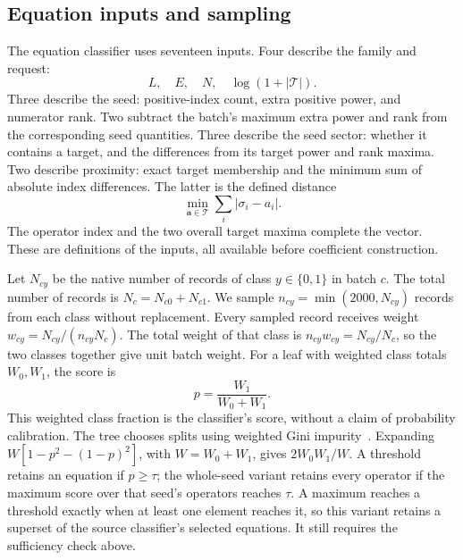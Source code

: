 \subsection{Equation inputs and sampling}
\label{app:equation-model}
The equation classifier uses seventeen inputs. Four describe the family and request:
\[L,\quad E,\quad N,\quad \log(1+|\mathcal T|).\]
 Three describe the seed: positive-index count, extra positive power, and numerator rank. Two subtract the batch's maximum extra power and rank from the corresponding seed quantities. Three describe the seed sector: whether it contains a target, and the differences from its target power and rank maxima. Two describe proximity: exact target membership and the minimum sum of absolute index differences. The latter is the defined distance
\[\min_{\boldsymbol a\in\mathcal T}\sum_i|\sigma_i-a_i|.\]
 The operator index and the two overall target maxima complete the vector. These are definitions of the inputs, all available before coefficient construction.

Let $N_{cy}$ be the native number of records of class $y\in\{0,1\}$ in batch $c$. The total number of records is $N_c=N_{c0}+N_{c1}$. We sample $n_{cy}=\min(2000,N_{cy})$ records from each class without replacement. Every sampled record receives weight $w_{cy}=N_{cy}/(n_{cy}N_c)$. The total weight of that class is $n_{cy}w_{cy}=N_{cy}/N_c$, so the two classes together give unit batch weight. For a leaf with weighted class totals $W_0,W_1$, the score is
\begin{equation}
 p=\frac{W_1}{W_0+W_1}.
 \label{eq:leaf-new}
\end{equation}
This weighted class fraction is the classifier's score, without a claim of probability calibration. The tree chooses splits using weighted Gini impurity~\cite{CART1984}. Expanding $W[1-p^2-(1-p)^2]$, with $W=W_0+W_1$, gives $2W_0W_1/W$. A threshold retains an equation if $p\geq\tau$; the whole-seed variant retains every operator if the maximum score over that seed's operators reaches $\tau$. A maximum reaches a threshold exactly when at least one element reaches it, so this variant retains a superset of the source classifier's selected equations. It still requires the sufficiency check above.

